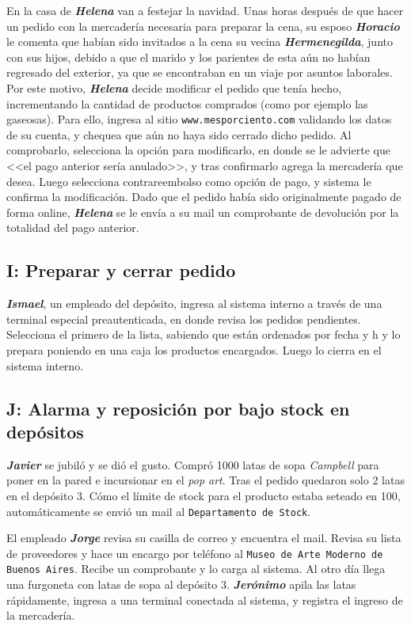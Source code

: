 En la casa de \textbf{\emph{Helena}} van a festejar la navidad. Unas horas
después de que hacer un pedido con la mercadería necesaria para preparar la
cena, su esposo \textbf{\emph{Horacio}} le comenta que habían sido invitados a
la cena su vecina \textbf{\emph{Hermenegilda}}, junto con sus hijos, debido a
que el marido y los parientes de esta aún no habían regresado del exterior, ya
que se encontraban en un viaje por asuntos laborales. Por este motivo,
\textbf{\emph{Helena}} decide modificar el pedido que tenía hecho,
incrementando la cantidad de productos comprados (como por ejemplo las
gaseosas). Para ello, ingresa al sitio \texttt{www.mesporciento.com} validando
los datos de su cuenta, y chequea que aún no haya sido cerrado dicho pedido.
Al comprobarlo, selecciona la opción para modificarlo, en donde se le advierte
que <<el pago anterior sería anulado>>, y tras confirmarlo agrega la
mercadería que desea. Luego selecciona contrareembolso como opción de pago, y
sistema le confirma la modificación. Dado que el pedido había sido
originalmente pagado de forma online, \textbf{\emph{Helena}} se le envía a su
mail un comprobante de devolución por la totalidad del pago anterior.

\subsection{I: Preparar y cerrar pedido}

\textbf{\emph{Ismael}}, un empleado del depósito, ingresa al sistema interno a
través de una terminal especial preautenticada, en donde revisa los pedidos
pendientes. Selecciona el primero de la lista, sabiendo que están ordenados por fecha y h
y lo prepara poniendo en una caja los productos encargados. Luego lo cierra en
el sistema interno.

\subsection{J: Alarma y reposición por bajo stock en depósitos}

\textbf{\emph{Javier}} se jubiló y se dió el gusto. Compró 1000 latas de sopa
\textit{Campbell} para poner en la pared e incursionar en el \textit{pop art}.
Tras el pedido quedaron solo 2 latas en el depósito 3. Cómo el límite de stock
para el producto estaba seteado en 100, automáticamente se envió un mail al
\texttt{Departamento de Stock}.

El empleado \textbf{\emph{Jorge}} revisa su casilla de correo y encuentra el
mail. Revisa su lista de proveedores y hace un encargo por teléfono al
\texttt{Museo de Arte Moderno de Buenos Aires}. Recibe un comprobante y lo
carga al sistema. Al otro día llega una furgoneta con latas de sopa al
depósito 3. \textbf{\emph{Jerónimo}} apila las latas rápidamente, ingresa a
una terminal conectada al sistema, y registra el ingreso de la mercadería.

